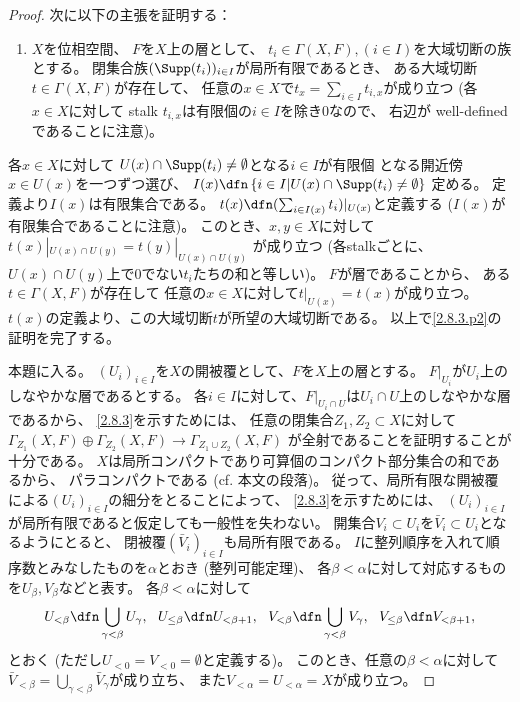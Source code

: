 \documentclass[uplatex,dvipdfmx]{jsarticle}
\begin{document}
\begin{proof}
  次に以下の主張を証明する：
  \begin{enumerate}[label=(\fnsymbol*),start=3]
    \item \label{2.8.3.p2}
    \(X\)を位相空間、
    \(F\)を\(X\)上の層として、
    \(t_i\in \Gamma(X,F), (i\in I)\)を大域切断の族とする。
    閉集合族\((\Supp(t_i))_{i\in I}\)が局所有限であるとき、
    ある大域切断\(t\in \Gamma(X,F)\)が存在して、
    任意の\(x\in X\)で\(t_x = \sum_{i\in I}t_{i,x}\)が成り立つ
    (各\(x\in X\)に対して
    stalk \(t_{i,x}\)は有限個の\(i\in I\)を除き\(0\)なので、
    右辺が well-defined であることに注意)。
  \end{enumerate}
  各\(x\in X\)に対して
  \(U(x) \cap \Supp(t_i) \neq \emptyset\)となる\(i\in I\)が有限個
  となる開近傍\(x\in U(x)\)を一つずつ選び、
  \(I(x) \dfn \left\{i\in I\middle| U(x)\cap \Supp(t_i) \neq \emptyset\right\}\)
  定める。
  定義より\(I(x)\)は有限集合である。
  \(t(x)\dfn (\sum_{i\in I(x)}t_i)|_{U(x)}\)と定義する
  (\(I(x)\)が有限集合であることに注意)。
  このとき、\(x,y\in X\)に対して
  \(t(x)|_{U(x)\cap U(y)} = t(y)|_{U(x)\cap U(y)}\)
  が成り立つ
  (各stalkごとに、\(U(x)\cap U(y)\)上で\(0\)でない\(t_i\)たちの和と等しい)。
  \(F\)が層であることから、
  ある\(t\in \Gamma(X,F)\)が存在して
  任意の\(x\in X\)に対して\(t|_{U(x)} = t(x)\)が成り立つ。
  \(t(x)\)の定義より、この大域切断\(t\)が所望の大域切断である。
  以上で\ref{2.8.3.p2}の証明を完了する。

  本題に入る。
  \((U_i)_{i\in I}\)を\(X\)の開被覆として、\(F\)を\(X\)上の層とする。
  \(F|_{U_i}\)が\(U_i\)上のしなやかな層であるとする。
  各\(i\in I\)に対して、\(F|_{U_i\cap U}\)は\(U_i\cap U\)上のしなやかな層であるから、
  \ref{2.8.3}を示すためには、
  任意の閉集合\(Z_1,Z_2\subset X\)に対して
  \(\Gamma_{Z_1}(X,F) \oplus \Gamma_{Z_2}(X,F)\to \Gamma_{Z_1\cup Z_2}(X,F)\)
  が全射であることを証明することが十分である。
  \(X\)は局所コンパクトであり可算個のコンパクト部分集合の和であるから、
  パラコンパクトである (cf. 本文\cite[Proposition 2.5.1]{kashiwara2002sheaves}の段落)。
  従って、局所有限な開被覆による\((U_i)_{i\in I}\)の細分をとることによって、
  \ref{2.8.3}を示すためには、
  \((U_i)_{i\in I}\)が局所有限であると仮定しても一般性を失わない。
  開集合\(V_i\subset U_i\)を\(\bar{V}_i\subset U_i\)となるようにとると、
  閉被覆\((\bar{V}_i)_{i\in I}\)も局所有限である。
  \(I\)に整列順序を入れて順序数とみなしたものを\(\alpha\)とおき (整列可能定理)、
  各\(\beta<\alpha\)に対して対応するものを\(U_{\beta},V_{\beta}\)などと表す。
  各\(\beta<\alpha\)に対して
  \[
  U_{<\beta} \dfn \bigcup_{\gamma<\beta}U_{\gamma}, \ \
  U_{\leq\beta} \dfn U_{<\beta+1}, \ \
  V_{<\beta} \dfn \bigcup_{\gamma<\beta}V_{\gamma}, \ \
  V_{\leq\beta} \dfn V_{<\beta+1},
  \]
  とおく
  (ただし\(U_{<0}=V_{<0}=\emptyset\)と定義する)。
  このとき、任意の\(\beta<\alpha\)に対して
  \(\bar{V}_{<\beta} = \bigcup_{\gamma<\beta}\bar{V}_{\gamma}\)が成り立ち、
  また\(V_{<\alpha} = U_{<\alpha} = X\)が成り立つ。


\end{proof}
\end{document}
